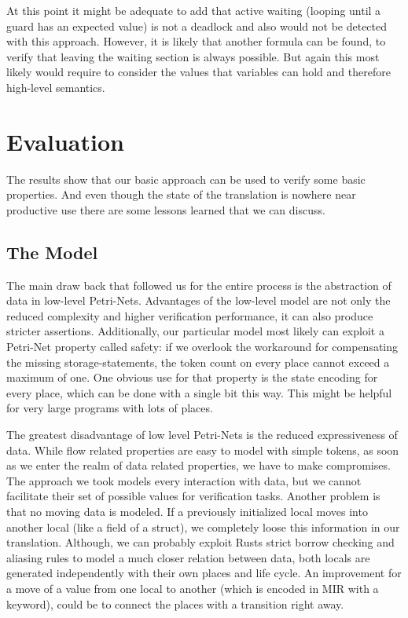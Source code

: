 At this point it might be adequate to add that active waiting (looping until a guard has an expected value) is not a deadlock and also would not be detected with this approach.
However, it is likely that another formula can be found, to verify that leaving the waiting section is always possible.
But again this most likely would require to consider the values that variables can hold and therefore high-level semantics.

\chapter{Evaluation}
The results show that our basic approach can be used to verify some basic properties.
And even though the state of the translation is nowhere near productive use there are some lessons learned that we can discuss.
\section{The Model}
The main draw back that followed us for the entire process is the abstraction of data in low-level Petri-Nets.
Advantages of the low-level model are not only the reduced complexity and higher verification performance, it can also produce stricter assertions.
Additionally, our particular model most likely can exploit a Petri-Net property called safety:
if we overlook the workaround for compensating the missing storage-statements, the token count on every place cannot exceed a maximum of one.
One obvious use for that property is the state encoding for every place, which can be done with a single bit this way.
This might be helpful for very large programs with lots of places.

The greatest disadvantage of low level Petri-Nets is the reduced expressiveness of data.
While flow related properties are easy to model with simple tokens, as soon as we enter the realm of data related properties, we have to make compromises.
The approach we took models every interaction with data, but we cannot facilitate their set of possible values for verification tasks.
Another problem is that no moving data is modeled.
If a previously initialized local moves into another local (like a field of a struct), we completely loose this information in our translation.
Although, we can probably exploit Rusts strict borrow checking and aliasing rules to model a much closer relation between data,
both locals are generated independently with their own places and life cycle.
An improvement for a move of a value from one local to another (which is encoded in MIR with a keyword), could be to connect the places with a transition right away.

